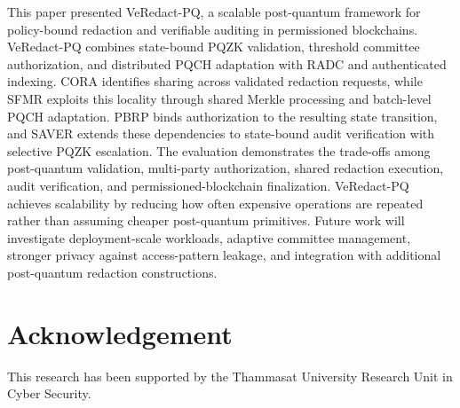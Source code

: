 \documentclass[lettersize,journal]{IEEEtran}
\begin{document}
This paper presented VeRedact-PQ, a scalable post-quantum framework
for policy-bound redaction and verifiable auditing in permissioned
blockchains. VeRedact-PQ combines state-bound PQZK validation,
threshold committee authorization, and distributed PQCH adaptation
with RADC and authenticated indexing. CORA identifies sharing across
validated redaction requests, while SFMR exploits this locality through
shared Merkle processing and batch-level PQCH adaptation. PBRP binds
authorization to the resulting state transition, and SAVER extends
these dependencies to state-bound audit verification with selective
PQZK escalation. The evaluation demonstrates the trade-offs among post-quantum
validation, multi-party authorization, shared redaction execution,
audit verification, and permissioned-blockchain finalization.
VeRedact-PQ achieves scalability by reducing how often expensive
operations are repeated rather than assuming cheaper post-quantum
primitives. Future work will investigate deployment-scale workloads,
adaptive committee management, stronger privacy against access-pattern
leakage, and integration with additional post-quantum redaction
constructions.
    
 \section{Acknowledgement}
    This research has been supported by the Thammasat University Research Unit in Cyber Security.
    
\end{document}
